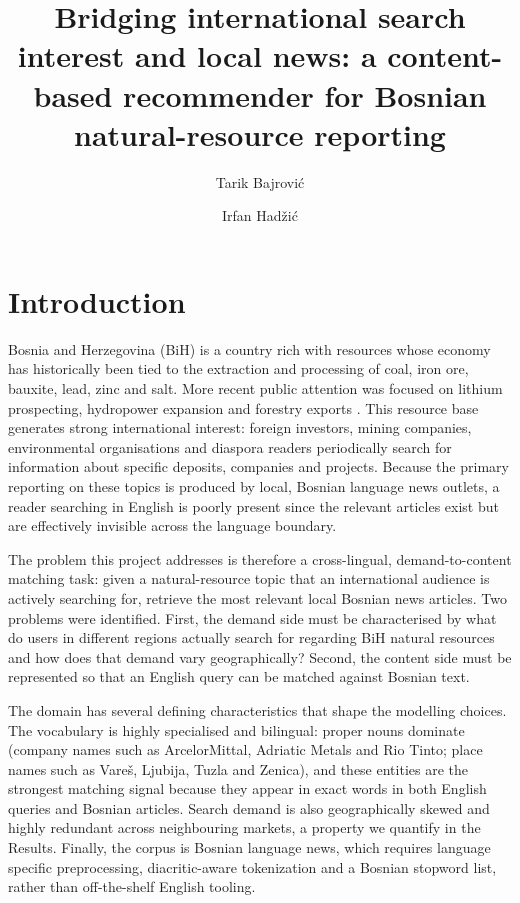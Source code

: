\documentclass[fleqn,10pt]{wlscirep}
\title{Bridging international search interest and local news: a content-based recommender for Bosnian natural-resource reporting}
\author[1,*]{Tarik Bajrović}
\author[1,*]{Irfan Hadžić}
\affil[1]{University of Sarajevo, Faculty of Electrical Engineering, Data Science and Artificial Intelligence, Sarajevo, Bosnia and Herzegovina}
\affil[*]{these authors contributed equally to this work}
\begin{document}
\flushbottom
\maketitle
\thispagestyle{empty}

\section*{Introduction}

Bosnia and Herzegovina (BiH) is a country rich with resources whose economy has historically been tied to the extraction and processing of coal, iron ore, bauxite, lead, zinc and salt. More recent public attention was focused on lithium prospecting, hydropower expansion and forestry exports \cite{eiti2021bih,usgs2023bih}. This resource base generates strong international interest: foreign investors, mining companies, environmental organisations and diaspora readers periodically search for information about specific deposits, companies and projects. Because the primary reporting on these topics is produced by local, Bosnian language news outlets, a reader searching in English is poorly present since the relevant articles exist but are effectively invisible across the language boundary.

The problem this project addresses is therefore a cross-lingual, demand-to-content matching task: given a natural-resource topic that an international audience is actively searching for, retrieve the most relevant local Bosnian news articles. Two problems were identified. First, the demand side must be characterised by what do users in different regions actually search for regarding BiH natural resources and how does that demand vary geographically? Second, the content side must be represented so that an English query can be matched against Bosnian text.

The domain has several defining characteristics that shape the modelling choices. The vocabulary is highly specialised and bilingual: proper nouns dominate (company names such as ArcelorMittal, Adriatic Metals and Rio Tinto; place names such as Vareš, Ljubija, Tuzla and Zenica), and these entities are the strongest matching signal because they appear in exact words in both English queries and Bosnian articles. Search demand is also geographically skewed and highly redundant across neighbouring markets, a property we quantify in the Results. Finally, the corpus is Bosnian language news, which requires language specific preprocessing, diacritic-aware tokenization and a Bosnian stopword list, rather than off-the-shelf English tooling.
\end{document}
